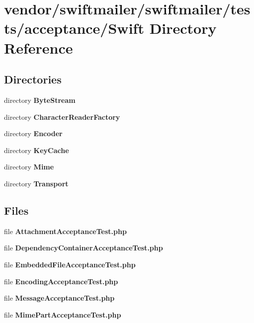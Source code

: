 \section{vendor/swiftmailer/swiftmailer/tests/acceptance/\+Swift Directory Reference}
\label{dir_0501ffad8443569011d229d3acefcdce}
\subsection*{Directories}
\begin{DoxyCompactItemize}
\item 
directory {\bf Byte\+Stream}
\item 
directory {\bf Character\+Reader\+Factory}
\item 
directory {\bf Encoder}
\item 
directory {\bf Key\+Cache}
\item 
directory {\bf Mime}
\item 
directory {\bf Transport}
\end{DoxyCompactItemize}
\subsection*{Files}
\begin{DoxyCompactItemize}
\item 
file {\bf Attachment\+Acceptance\+Test.\+php}
\item 
file {\bf Dependency\+Container\+Acceptance\+Test.\+php}
\item 
file {\bf Embedded\+File\+Acceptance\+Test.\+php}
\item 
file {\bf Encoding\+Acceptance\+Test.\+php}
\item 
file {\bf Message\+Acceptance\+Test.\+php}
\item 
file {\bf Mime\+Part\+Acceptance\+Test.\+php}
\end{DoxyCompactItemize}
